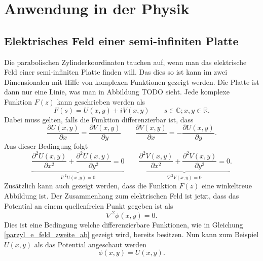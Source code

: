 %
%
%
\section{Anwendung in der Physik 
\label{parzyl:section:teil2}}


\subsection{Elektrisches Feld einer semi-infiniten Platte
\label{parzyl:subsection:bonorum}}
Die parabolischen Zylinderkoordinaten tauchen auf, wenn man das elektrische Feld einer semi-infiniten Platte finden will.
Das dies so ist kann im zwei Dimensionalen mit Hilfe von komplexen Funktionen gezeigt werden. Die Platte ist dann nur eine Linie, was man in Abbildung TODO sieht.
Jede komplexe Funktion $F(z)$ kann geschrieben werden als
\begin{equation}
	F(s) = U(x,y) + iV(x,y) \qquad s \in \mathbb{C}; x,y \in \mathbb{R}.
\end{equation}  
Dabei muss gelten, falls die Funktion differenzierbar ist, dass
\begin{equation}
	\frac{\partial U(x,y)}{\partial x} 
	=
	\frac{\partial V(x,y)}{\partial y} 
	\qquad
	\frac{\partial V(x,y)}{\partial x}
	=
	-\frac{\partial U(x,y)}{\partial y}.
\end{equation}
Aus dieser Bedingung folgt 
\begin{equation}
	\label{parzyl_e_feld_zweite_ab}
	\underbrace{
	\frac{\partial^2 U(x,y)}{\partial x^2}
	+ 
	\frac{\partial^2 U(x,y)}{\partial y^2}
	=
	0
	}_{\displaystyle{\nabla^2U(x,y)=0}}
	\qquad
	\underbrace{
	\frac{\partial^2 V(x,y)}{\partial x^2}
	+
	\frac{\partial^2 V(x,y)}{\partial y^2}
	=
	0
	}_{\displaystyle{\nabla^2V(x,y) = 0}}.
\end{equation}
Zusätzlich kann auch gezeigt werden, dass die Funktion $F(z)$ eine winkeltreue Abbildung ist. 
Der Zusammenhang zum elektrischen Feld ist jetzt, dass das Potential an einem quellenfreien Punkt gegeben ist als 
\begin{equation}
	\nabla^2\phi(x,y) = 0.
\end{equation}
Dies ist eine Bedingung welche differenzierbare Funktionen, wie in Gleichung \ref{parzyl_e_feld_zweite_ab} gezeigt wird, bereits besitzen. 
Nun kann zum Beispiel $U(x,y)$ als das Potential angeschaut werden
\begin{equation}
	\phi(x,y) = U(x,y).
\end{equation}
